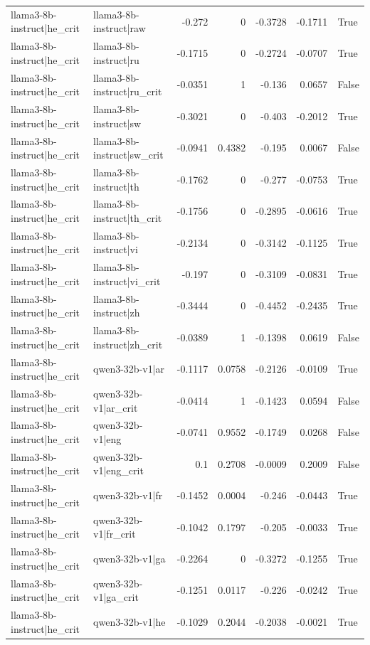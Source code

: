 \begin{table}
\begin{tabular}{l l r r r r l}
llama3-8b-instruct|he_crit & llama3-8b-instruct|raw & -0.272 & 0 & -0.3728 & -0.1711 & True \\
llama3-8b-instruct|he_crit & llama3-8b-instruct|ru & -0.1715 & 0 & -0.2724 & -0.0707 & True \\
llama3-8b-instruct|he_crit & llama3-8b-instruct|ru_crit & -0.0351 & 1 & -0.136 & 0.0657 & False \\
llama3-8b-instruct|he_crit & llama3-8b-instruct|sw & -0.3021 & 0 & -0.403 & -0.2012 & True \\
llama3-8b-instruct|he_crit & llama3-8b-instruct|sw_crit & -0.0941 & 0.4382 & -0.195 & 0.0067 & False \\
llama3-8b-instruct|he_crit & llama3-8b-instruct|th & -0.1762 & 0 & -0.277 & -0.0753 & True \\
llama3-8b-instruct|he_crit & llama3-8b-instruct|th_crit & -0.1756 & 0 & -0.2895 & -0.0616 & True \\
llama3-8b-instruct|he_crit & llama3-8b-instruct|vi & -0.2134 & 0 & -0.3142 & -0.1125 & True \\
llama3-8b-instruct|he_crit & llama3-8b-instruct|vi_crit & -0.197 & 0 & -0.3109 & -0.0831 & True \\
llama3-8b-instruct|he_crit & llama3-8b-instruct|zh & -0.3444 & 0 & -0.4452 & -0.2435 & True \\
llama3-8b-instruct|he_crit & llama3-8b-instruct|zh_crit & -0.0389 & 1 & -0.1398 & 0.0619 & False \\
llama3-8b-instruct|he_crit & qwen3-32b-v1|ar & -0.1117 & 0.0758 & -0.2126 & -0.0109 & True \\
llama3-8b-instruct|he_crit & qwen3-32b-v1|ar_crit & -0.0414 & 1 & -0.1423 & 0.0594 & False \\
llama3-8b-instruct|he_crit & qwen3-32b-v1|eng & -0.0741 & 0.9552 & -0.1749 & 0.0268 & False \\
llama3-8b-instruct|he_crit & qwen3-32b-v1|eng_crit & 0.1 & 0.2708 & -0.0009 & 0.2009 & False \\
llama3-8b-instruct|he_crit & qwen3-32b-v1|fr & -0.1452 & 0.0004 & -0.246 & -0.0443 & True \\
llama3-8b-instruct|he_crit & qwen3-32b-v1|fr_crit & -0.1042 & 0.1797 & -0.205 & -0.0033 & True \\
llama3-8b-instruct|he_crit & qwen3-32b-v1|ga & -0.2264 & 0 & -0.3272 & -0.1255 & True \\
llama3-8b-instruct|he_crit & qwen3-32b-v1|ga_crit & -0.1251 & 0.0117 & -0.226 & -0.0242 & True \\
llama3-8b-instruct|he_crit & qwen3-32b-v1|he & -0.1029 & 0.2044 & -0.2038 & -0.0021 & True \\

\end{tabular}
\end{table}
